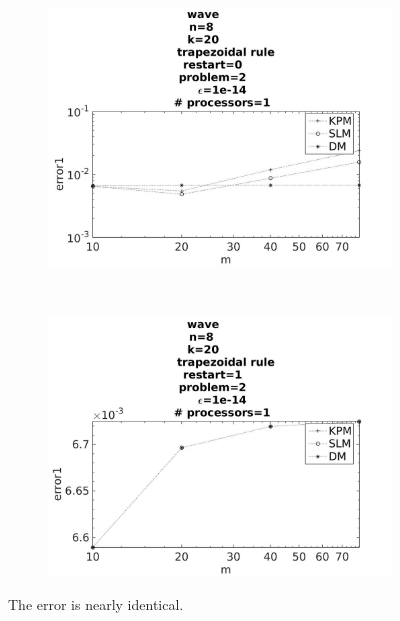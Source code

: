 \begin{figure}[H]
        \centering
        \begin{subfigure}[b]{0.45\textwidth}
                \includegraphics[width=\textwidth]{../MATLAB/fig/vresulterrorr.jpg}
                \caption{  }
                \label{fig:vresulterror1}
        \end{subfigure}
        ~
        \begin{subfigure}[b]{0.45\textwidth}
                \includegraphics[width=\textwidth]{../MATLAB/fig/vresulterror.jpg}
                \caption{  }
                \label{fig:vresulterror2}
        \end{subfigure}
        \caption{ The error is nearly identical.  }
        \label{fig:vresulterror}
\end{figure}


